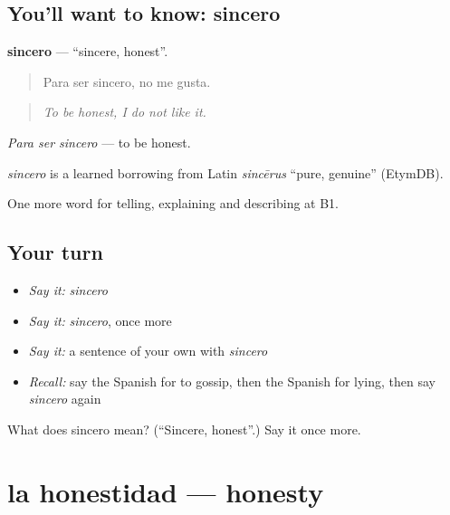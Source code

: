 \subsection*{You'll want to know: sincero}
\textbf{sincero} — \textquotedblleft{}sincere, honest\textquotedblright{}.

\begin{quote}
Para ser sincero, no me gusta.
\end{quote}

\begin{quote}
\emph{To be honest, I do not like it.}
\end{quote}

\emph{Para ser sincero} — to be honest.

\begin{cousinweb}
\emph{sincero} is a learned borrowing from Latin \emph{sincērus} \textquotedblleft{}pure, genuine\textquotedblright{} (EtymDB).
\end{cousinweb}

\begin{grammarlens}[title={What you've built}]
One more word for telling, explaining and describing at B1.
\end{grammarlens}

\subsection*{Your turn}
\begin{itemize}
\raggedright
  \item \emph{Say it:} \emph{sincero}
  \item \emph{Say it:} \emph{sincero}, once more
  \item \emph{Say it:} a sentence of your own with \emph{sincero}
  \item \emph{Recall:} say the Spanish for to gossip, then the Spanish for lying, then say \emph{sincero} again
\end{itemize}

\begin{tcolorbox}[breakable,colback=teal!4,colframe=teal!35!black,title={Before you move on}]
What does sincero mean? (\textquotedblleft{}Sincere, honest\textquotedblright{}.) Say it once more.
\end{tcolorbox}
\section[la honestidad]{la honestidad — honesty}

